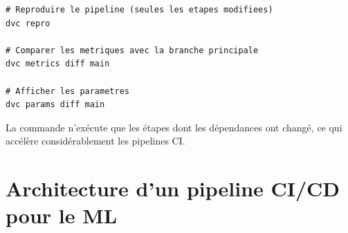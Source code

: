 \begin{bonnepratique}[title=\textbf{Commandes DVC dans la CI}]
\begin{verbatim}
# Reproduire le pipeline (seules les etapes modifiees)
dvc repro

# Comparer les metriques avec la branche principale
dvc metrics diff main

# Afficher les parametres
dvc params diff main
\end{verbatim}
La commande  n'ex\'ecute que les \'etapes dont les d\'ependances ont chang\'e, ce qui acc\'el\`ere consid\'erablement les pipelines CI.
\end{bonnepratique}

\section{Architecture d'un pipeline CI/CD pour le ML}
\label{sec:cicd-architecture}

